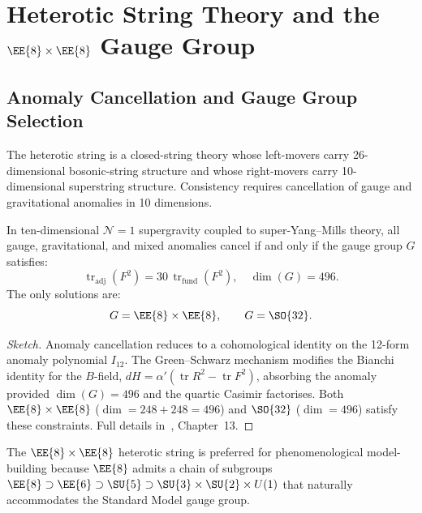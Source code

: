 \section{Heterotic String Theory and the $\EE{8}\times\EE{8}$ Gauge Group}
\label{sec:heterotic}

\subsection{Anomaly Cancellation and Gauge Group Selection}

The heterotic string is a closed-string theory whose left-movers carry
26-dimensional bosonic-string structure and whose right-movers carry
10-dimensional superstring structure.  Consistency requires cancellation of
gauge and gravitational anomalies in 10 dimensions.

\begin{theorem}
\label{thm:anomaly_cancel}
In ten-dimensional $\mathcal{N}=1$ supergravity coupled to super-Yang--Mills
theory, all gauge, gravitational, and mixed anomalies cancel if and only if
the gauge group $G$ satisfies:
\begin{equation}
\label{eq:anomaly_condition}
\operatorname{tr}_{\mathrm{adj}}(F^2) = 30\,\operatorname{tr}_{\mathrm{fund}}(F^2),
\quad
\dim(G) = 496.
\end{equation}
The only solutions are:
\begin{equation}
G = \EE{8}\times\EE{8}, \qquad G = \SO{32}.
\end{equation}
\end{theorem}

\begin{proof}[Sketch]
Anomaly cancellation reduces to a cohomological identity on the 12-form
anomaly polynomial $I_{12}$.  The Green--Schwarz mechanism modifies the
Bianchi identity for the $B$-field, $dH = \alpha'(\operatorname{tr} R^2
- \operatorname{tr} F^2)$, absorbing the anomaly provided
$\dim(G) = 496$ and the quartic Casimir factorises.  Both
$\EE{8}\times\EE{8}$ ($\dim = 248+248 = 496$) and $\SO{32}$
($\dim = 496$) satisfy these constraints.  Full details
in~\cite{green2012superstring}, Chapter~13.
\end{proof}

\begin{remark}
The $\EE{8}\times\EE{8}$ heterotic string is preferred for phenomenological
model-building because $\EE{8}$ admits a chain of subgroups
$\EE{8} \supset \EE{6} \supset \SU{5} \supset \SU{3}\times\SU{2}\times U(1)$
that naturally accommodates the Standard Model gauge group.
\end{remark}


